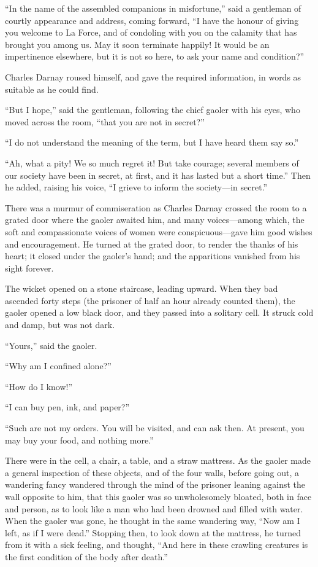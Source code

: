 ``In the name of the assembled companions in misfortune,'' said a
gentleman of courtly appearance and address, coming forward,
``I have the honour of giving you welcome to La Force, and of
condoling with you on the calamity that has brought you among us.
May it soon terminate happily!  It would be an impertinence elsewhere,
but it is not so here, to ask your name and condition?''

Charles Darnay roused himself, and gave the required information,
in words as suitable as he could find.

``But I hope,'' said the gentleman, following the chief gaoler with his
eyes, who moved across the room, ``that you are not in secret?''

``I do not understand the meaning of the term, but I have heard them
say so.''

``Ah, what a pity!  We so much regret it!  But take courage; several
members of our society have been in secret, at first, and it has
lasted but a short time.''  Then he added, raising his voice,
``I grieve to inform the society---in secret.''

There was a murmur of commiseration as Charles Darnay crossed the
room to a grated door where the gaoler awaited him, and many
voices---among which, the soft and compassionate voices of women were
conspicuous---gave him good wishes and encouragement.  He turned at
the grated door, to render the thanks of his heart; it closed under
the gaoler's hand; and the apparitions vanished from his sight forever.

The wicket opened on a stone staircase, leading upward.  When they
bad ascended forty steps (the prisoner of half an hour already
counted them), the gaoler opened a low black door, and they passed
into a solitary cell.  It struck cold and damp, but was not dark.

``Yours,'' said the gaoler.

``Why am I confined alone?''

``How do I know!''

``I can buy pen, ink, and paper?''

``Such are not my orders.  You will be visited, and can ask then.
At present, you may buy your food, and nothing more.''

There were in the cell, a chair, a table, and a straw mattress.
As the gaoler made a general inspection of these objects, and of the
four walls, before going out, a wandering fancy wandered through the
mind of the prisoner leaning against the wall opposite to him, that
this gaoler was so unwholesomely bloated, both in face and person,
as to look like a man who had been drowned and filled with water.
When the gaoler was gone, he thought in the same wandering way,
``Now am I left, as if I were dead.''  Stopping then, to look down at
the mattress, he turned from it with a sick feeling, and thought,
``And here in these crawling creatures is the first condition of the
body after death.''

